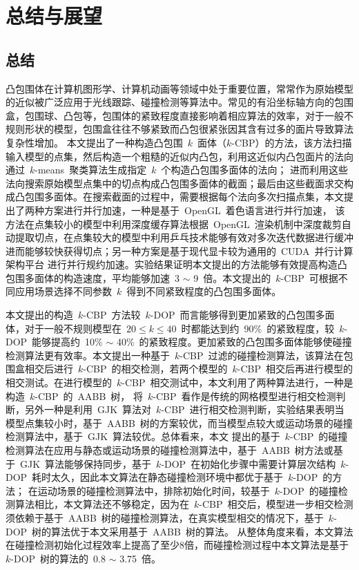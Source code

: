 

\chapter{总结与展望}
\label{cha:summery:futurework}
\section{总结}
\label{sec:summery}

凸包围体在计算机图形学、计算机动画等领域中处于重要位置，常常作为原始模型的近似被广泛应用于光线跟踪、碰撞检测等算法中。常见的有沿坐标轴方向的包围盒，包围球、凸包等，包围体的紧致程度直接影响着相应算法的效率，对于一般不规则形状的模型，包围盒往往不够紧致而凸包很紧张因其含有过多的面片导致算法复杂性增加。
本文提出了一种构造凸包围~$k$~面体（$k$-CBP）的方法，该方法扫描输入模型的点集，然后构造一个粗糙的近似内凸包，利用这近似内凸包面片的法向通过~$k$-means~聚类算法生成指定~$k$~个构造凸包围多面体的法向；
进而利用这些法向搜索原始模型点集中的切点构成凸包围多面体的截面；最后由这些截面求交构成凸包围多面体。在搜索截面的过程中，需要根据每个法向多次扫描点集，本文提出了两种方案进行并行加速，一种是基于~OpenGL~着色语言进行并行加速，
该方法在点集较小的模型中利用深度缓存算法根据~OpenGL~渲染机制中深度裁剪自动提取切点，在点集较大的模型中利用乒乓技术能够有效对多次迭代数据进行缓冲进而能够较快获得切点；另一种方案是基于现代显卡较为通用的~CUDA~并行计算架构平台
进行并行规约加速。实验结果证明本文提出的方法能够有效提高构造凸包围多面体的构造速度，平均能够加速~3 $\sim$ 9~倍。本文提出的~$k$-CBP~可根据不同应用场景选择不同参数~$k$~得到不同紧致程度的凸包围多面体。

本文提出的构造~$k$-CBP~方法较~$k$-DOP~而言能够得到更加紧致的凸包围多面体，对于一般不规则模型在~$20 \leq k \leq 40 $~时都能达到约~90\%~的紧致程度，较~$k$-DOP~能够提高约~10\% $\sim$ 40\%~的紧致程度。更加紧致的凸包围多面体能够使碰撞检测算法更有效率。本文提出一种基于~$k$-CBP~过滤的碰撞检测算法，该算法在包围盒相交后进行~$k$-CBP~的相交检测，若两个模型的~$k$-CBP~相交后再进行模型的相交测试。在进行模型的~$k$-CBP~相交测试中，本文利用了两种算法进行，一种是构造~$k$-CBP~的~AABB~树，
将~$k$-CBP~看作是传统的网格模型进行相交检测判断，另外一种是利用~GJK~算法对~$k$-CBP~进行相交检测判断，实验结果表明当模型点集较小时，基于~AABB~树的方案较优，而当模型点较大或运动场景的碰撞检测算法中，基于~GJK~算法较优。总体看来，本文
提出的基于~$k$-CBP~的碰撞检测算法在应用与静态或运动场景的碰撞检测算法中，基于~AABB~树方法或基于~GJK~算法能够保持同步，基于~$k$-DOP~在初始化步骤中需要计算层次结构~$k$-DOP~耗时太久，因此本文算法在静态碰撞检测环境中都优于基于~$k$-DOP~的方法；
在运动场景的碰撞检测算法中，排除初始化时间，较基于~$k$-DOP~的碰撞检测算法相比，本文算法还不够稳定，因为在~$k$-CBP~相交后，模型进一步相交检测须依赖于基于~AABB~树的碰撞检测算法，在真实模型相交的情况下，基于~$k$-DOP~树的算法优于本文采用基于~AABB~树的算法。
从整体角度来看，本文算法在碰撞检测初始化过程效率上提高了至少8倍，而碰撞检测过程中本文算法是基于~$k$-DOP~树的算法的~0.8 $\sim$ 3.75~倍。

